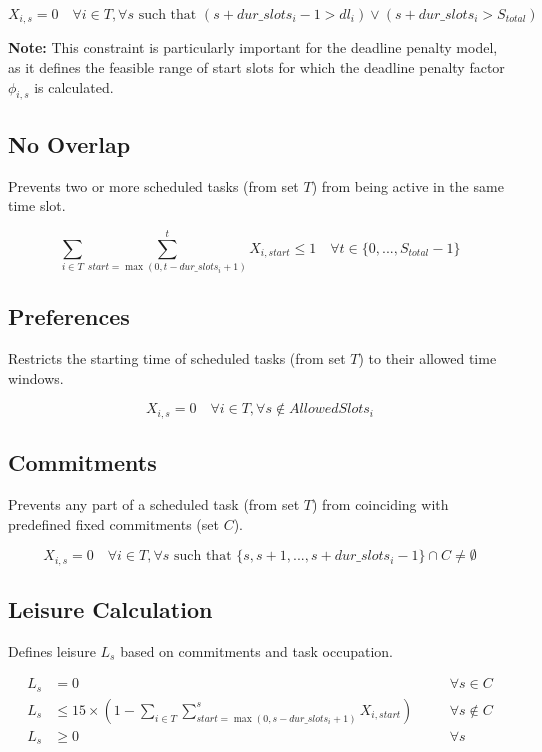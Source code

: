 \documentclass{article}
\begin{document}
\[
X_{i,s} = 0 \quad \forall i \in T, \forall s \text{ such that } (s + dur\_slots_i - 1 > dl_i) \lor (s + dur\_slots_i > S_{total})
\]

\textbf{Note:} This constraint is particularly important for the deadline penalty model, as it defines the feasible range of start slots for which the deadline penalty factor $\phi_{i,s}$ is calculated.

\subsection{No Overlap}
Prevents two or more scheduled tasks (from set $T$) from being active in the same time slot.

\begin{equation}
\sum_{i \in T} \sum_{start = \max(0, t - dur\_slots_i + 1)}^{t} X_{i,start} \le 1 \quad \forall t \in \{0, ..., S_{total}-1\} \label{eq:no_overlap}
\end{equation}

\subsection{Preferences}
Restricts the starting time of scheduled tasks (from set $T$) to their allowed time windows.

\[
X_{i,s} = 0 \quad \forall i \in T, \forall s \notin AllowedSlots_i
\]

\subsection{Commitments}
Prevents any part of a scheduled task (from set $T$) from coinciding with predefined fixed commitments (set $C$).

\[
X_{i,s} = 0 \quad \forall i \in T, \forall s \text{ such that } \{s, s+1, ..., s + dur\_slots_i - 1\} \cap C \neq \emptyset
\]

\subsection{Leisure Calculation}
Defines leisure $L_s$ based on commitments and task occupation.

\begin{align}
L_s &= 0 \quad &&\forall s \in C \label{eq:leisure_commit_noY} \\
L_s &\le 15 \times \left(1 - \sum_{i \in T} \sum_{start = \max(0, s - dur\_slots_i + 1)}^{s} X_{i,start}\right) \quad &&\forall s \notin C \label{eq:leisure_task_noY} \\
L_s &\ge 0 \quad &&\forall s \label{eq:leisure_nonneg_noY}
\end{align}
\end{document}
